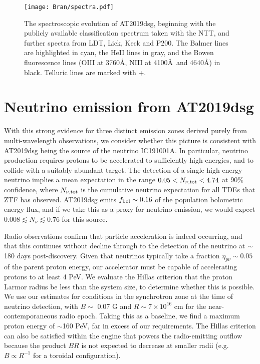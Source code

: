 \begin{figure*}[h!]
	\texttt{[image: Bran/spectra.pdf]}
	\caption{The spectroscopic evolution of AT2019dsg, beginning with the publicly available classification spectrum taken with the NTT\cite{2019ATel12752....1N}, and further spectra from LDT, Lick, Keck and P200. The Balmer lines are highlighted in cyan, the HeII lines in gray, and the Bowen fluorescence lines (OIII at 3760\AA, NIII at 4100\AA ~and 4640\AA) in black. Telluric lines are marked with +.}
	\label{fig:bran_spectrum}
\end{figure*}

\section{Neutrino emission from AT2019dsg} With this strong evidence for three distinct emission zones derived purely from multi-wavelength observations, we consider whether this picture is consistent with AT2019dsg being the source of the neutrino IC191001A. In particular, neutrino production requires protons to be accelerated to sufficiently high energies, and to collide with a suitably abundant target. The detection of a single high-energy neutrino implies a mean expectation in the range $0.05 < N_{\nu, \textup{tot}} < 4.74$ at 90\% confidence, where $N_{\nu, \textup{tot}}$ is the cumulative neutrino expectation for all TDEs that ZTF has observed. AT2019dsg emits $f_{\textup{bol}} \sim 0.16$ of the population bolometric energy flux, and if we take this as a proxy for neutrino emission, we would expect $0.008 \lesssim N_{\nu} \lesssim 0.76$ for this source.


Radio observations confirm that particle acceleration is indeed occurring, and that this continues without decline through to the detection of the neutrino at $\sim$180 days post-discovery. Given that neutrinos typically take a fraction $\eta_{p\nu} \sim 0.05$ of the parent proton energy, our accelerator must be capable of accelerating protons to at least 4 PeV. We evaluate the Hillas criterion\cite{1984ARA&A..22..425H} that the proton Larmor radius be less than the system size, to determine whether this is possible. We use  our estimates for conditions in the synchrotron zone at the time of neutrino detection, with $B \sim$ 0.07 G and $R \sim 7 \times 10^{16}$ cm for the near-contemporaneous radio epoch. Taking this as a baseline, we find a maximum proton energy of $\sim$160 PeV, far in excess of our requirements. The Hillas criterion can also be satisfied within the engine that powers the radio-emitting outflow because the product $BR$ is not expected to decrease at smaller radii (e.g. $B \propto R^{-1}$ for a toroidal configuration). 

